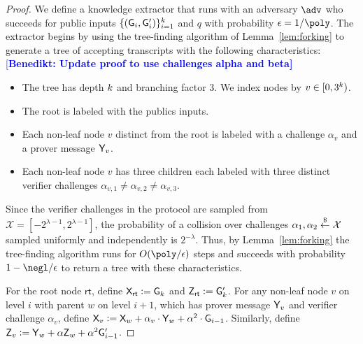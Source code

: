 \documentclass[12pt]{article}
\theoremstyle{Definition}
\newcommand{\benedikt}[1]{{\textcolor{blue}{[\bf Benedikt: #1]}}}
\begin{document}
	\begin{proof}
		We define a knowledge extractor that runs with an adversary $\adv$ who succeeds for public inputs $\{(\mathsf{G}_i,\mathsf{G}_i')\}_{i=1}^{k}$ and $q$ with probability $\epsilon = 1/\poly$. The extractor begins by using the tree-finding algorithm of Lemma~\ref{lem:forking} to generate a tree of accepting transcripts with the following characteristics: 
\benedikt{Update proof to use challenges alpha and beta}
\begin{itemize}
\item The tree has depth $k$ and branching factor $3$. We index nodes by $v \in [0,3^k)$.

\item The root is labeled with the publics inputs. 
\item Each non-leaf node $v$ distinct from the root is labeled with a challenge $\alpha_{v}$ and a prover message $\mathsf{Y}_v$. 
\item Each non-leaf node $v$ has three children each labeled with three distinct verifier challenges 
$\alpha_{v,1} \neq \alpha_{v,2} \neq \alpha_{v,3}$.

\end{itemize} 

Since the verifier challenges in the protocol are sampled from $\mathcal{X} = [-2^{\lambda -1}, 2^{\lambda -1}]$, the probability of a collision over challenges $\alpha_1, \alpha_2 \overset{\$}{\gets} \mathcal{X}$ sampled uniformly and independently is $2^{-\lambda}$. Thus, by Lemma~\ref{lem:forking} the tree-finding algorithm runs for $O(\poly/\epsilon)$ steps and succeeds with probability $1 - \negl/\epsilon$ to return a tree with these characteristics.

For the root node $\textsf{rt}$, define $\mathsf{X}_\textsf{rt} \mathrel{\mathop:}= \mathsf{G}_k$ and $\mathsf{Z}_\textsf{rt} \mathrel{\mathop:}= \mathsf{G}'_k$. For any non-leaf node $v$ on level $i$ with parent $w$ on level $i+1$, which has prover message $\mathsf{Y}_v$ and verifier challenge $\alpha_v$, define $\mathsf{X}_v \mathrel{\mathop:}= \mathsf{X}_w + \alpha_v \cdot \mathsf{Y}_w + \alpha^2 \cdot \mathsf{G}_{i-1}$. Similarly, define $\mathsf{Z}_v \mathrel{\mathop:}= \mathsf{Y}_w + \alpha \mathsf{Z}_w + \alpha^2 \mathsf{G}'_{i-1}$.


\end{proof}
\end{document}
